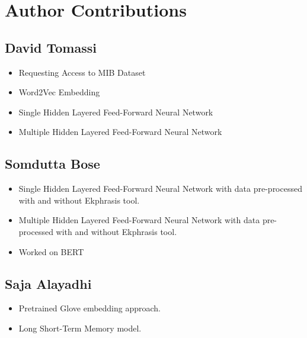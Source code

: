 \section{Author Contributions}
\label{sec:author-contributions}

\subsection{David Tomassi}
\begin{itemize}
    \item Requesting Access to MIB Dataset
    \item Word2Vec Embedding
    \item Single Hidden Layered Feed-Forward Neural Network
    \item Multiple Hidden Layered Feed-Forward Neural Network
\end{itemize}

\subsection{Somdutta Bose}
\begin{itemize}
    \item Single Hidden Layered Feed-Forward Neural Network with data pre-processed with and without Ekphrasis tool.
    \item Multiple Hidden Layered Feed-Forward Neural Network with data pre-processed with and without Ekphrasis tool.
    \item Worked on BERT
\end{itemize}
\subsection{Saja Alayadhi}
\begin{itemize}
    \item Pretrained Glove embedding approach.
    \item Long Short-Term Memory model.
\end{itemize}